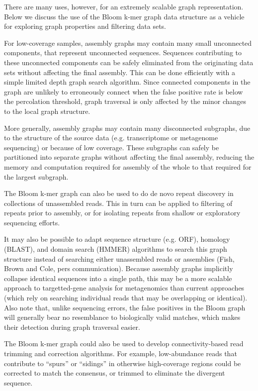 \documentclass[12pt]{article} \usepackage{simplemargins}
\begin{document}
There are many uses, however, for an extremely scalable
graph representation.  Below we discuss the use of the
Bloom k-mer graph data structure as a vehicle for exploring graph
properties and filtering data sets.

For low-coverage samples, assembly graphs may contain many small
unconnected components, that represent unconnected sequences.
Sequences contributing to these unconnected components can be safely
eliminated from the originating data sets without affecting the final
assembly.  This can be done efficiently with a simple limited depth
graph search algorithm. Since connected components in the graph 
are unlikely to erroneously connect when the false positive rate 
is below the percolation threshold, graph traversal is only affected 
by the minor changes to the local graph structure.

More generally, assembly graphs may contain many disconnected
subgraphs, due to the structure of the source data (e.g. transcriptome
or metagenome sequencing) or because of low coverage.  These subgraphs
can safely be partitioned into separate graphs without affecting the
final assembly, reducing the memory and computation required for
assembly of the whole to that required for the largest subgraph.

The Bloom k-mer graph can also be used to do de novo repeat discovery
in collections of unassembled reads.  This in turn can be applied to
filtering of repeats prior to assembly\cite{hydra}, or for isolating
repeats from shallow or exploratory sequencing efforts.

It may also be possible to adapt sequence structure (e.g. ORF),
homology (BLAST), and domain search (HMMER) algorithms to search this
graph structure instead of searching either unassembled reads or
assemblies (Fish, Brown and Cole, pers communication).  Because 
assembly graphs implicitly collapse identical
sequences into a single path, this may be a more scalable approach to
targetted-gene analysis for metagenomics than current approaches
(which rely on searching individual reads that may be overlapping or identical).  Also note that, unlike
sequencing errors, the false positives in the Bloom graph will
generally bear no resemblance to biologically valid matches, which 
makes their detection during graph traversal easier.

The Bloom k-mer graph could also be used to develop connectivity-based
read trimming and correction algorithms.  For example, low-abundance
reads that contribute to ``spurs'' or ``sidings'' in otherwise
high-coverage regions could be corrected to match the
consensus, or trimmed to eliminate the divergent sequence.
\end{document}
